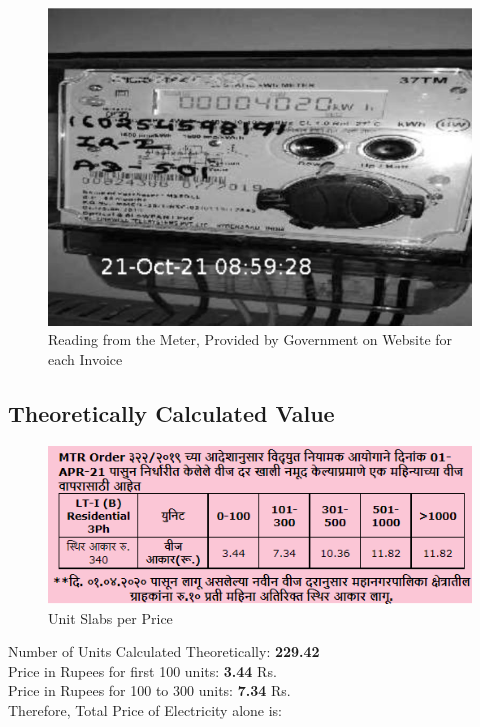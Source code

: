 \documentclass[11pt,a4paper]{article}
\begin{document}
\begin{figure}[H]
	\centering
	\includegraphics[scale=0.3]{meter.jpg}
	\caption{Reading from the Meter, Provided by Government on Website for each Invoice}
\end{figure}

\subsection{Theoretically Calculated Value}

\begin{figure}[H]
	\centering
	\includegraphics[scale=0.7]{Unit Price Slabs.png}
	\caption{Unit Slabs per Price}
\end{figure}


\noindent
Number of Units Calculated Theoretically\hfill: \textbf{229.42}\\
Price in Rupees for first 100 units\hfill: \textbf{3.44} Rs.\\
Price in Rupees for 100 to 300 units\hfill: \textbf{7.34} Rs. \\
\noindent
Therefore, Total Price of Electricity alone is: \\
\end{document}
